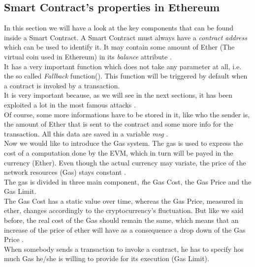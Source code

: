 \subsection{Smart Contract's properties in Ethereum}
In this section we will have a look at the key components that can be found inside a Smart Contract.
A Smart Contract must always have a {\itshape contract address} 
which can be used to identify it. It may contain some amount of Ether (The virtual coin used in Ethereum) in its {\itshape balance} attribute \cite{paper1}.
\\It has a very important function which does not take any parameter at all, i.e. the so called {\itshape Fallback} function(). This function will be triggered by default when a contract is invoked by a transaction.
\\It is very important because, as we will see in the next sections, it has been exploited a lot in the most famous attacks \cite{paper2}. 
\\Of course, some more informations have to be stored in it, like who the sender is, the amount of Ether that is sent to the contract and some more info for the transaction. All this data are saved in a variable \textit{msg} \cite{daje}. 
\\Now we would like to introduce the Gas system. The gas is used to express the cost of a computation done by the EVM, which in turn will be payed in the currency (Ether). Even though the actual currency may variate, the price of the network resources (Gas) stays constant \cite{paper3}. 
\\The gas is divided in three main component, {\textit the Gas Cost, the Gas Price and the Gas Limit.}
\\The Gas Cost has a static value over time, whereas the Gas Price, measured in ether, changes accordingly to the cryptocurrency's fluctuation. But like we said before, the real cost of the Gas should remain the same, which means that an increase of the price of ether will have as a consequence a drop down of the Gas Price \cite{paper1}. 
\\When somebody sends a transaction to invoke a contract, he has to specify hos much Gas he/she is willing to provide for its execution (Gas Limit). 




